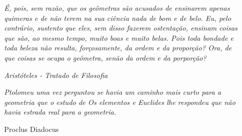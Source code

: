 \begin{center}
\textit{É, pois, sem razão, que os geômetras são acusados de ensinarem apenas\\ quimeras e de não terem na sua ciência nada de bom e de belo. Eu, pelo\\ contrário, sustento que eles, sem disso fazerem ostentação, ensinam coisas\\ que são, ao mesmo tempo, muito boas e muito belas. Pois toda bondade e\\ toda beleza não resulta, forçosamente, da ordem e da proporção? Ora, de\\ que coisas se ocupa o geômetra, senão da ordem e da porporção?}
\end{center}

\begin{flushright}
\textsl{Aristóteles - Tratado de Filosofia}
\end{flushright}

\begin{center}
\textit{Ptolomeu uma vez perguntou se havia um caminho mais curto para a\\ geometria que o estudo de Os elementos e Euclides lhe respondeu que não\\ havia estrada real para a geometria.}
\end{center}

\begin{flushright}
Proclus Diadocus
\end{flushright}


